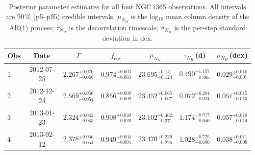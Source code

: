 \documentclass{aa}
\begin{document}
\begin{table}[ht]
  \centering
  \caption{Posterior parameter estimates for all four NGC\,1365
    observations. All intervals are 90\,\% (p5--p95) credible intervals.
    $\mu_{N_H}$ is the log$_{10}$ mean column density of the
    AR(1) process; $\tau_{N_H}$ is the decorrelation timescale;
    $\sigma_{N_H}$ is the per-step standard deviation in dex.}
  \label{tab:ngc1365_results}
  \begin{tabular}{lcccccc}
    \hline\hline
    Obs & Date & $\Gamma$ & $f_{\mathrm{cov}}$ & $\mu_{N_H}$ & $\tau_{N_H}$\,(d) & $\sigma_{N_H}$\,(dex) \\
    \hline
    1 & 2012-07-25 &
      $2.267^{+0.070}_{-0.066}$ &
      $0.974^{+0.002}_{-0.003}$ &
      $23.695^{+0.141}_{-0.124}$ &
      $0.490^{+1.157}_{-0.365}$ &
      $0.029^{+0.010}_{-0.007}$ \\[2pt]
    2 & 2012-12-24 &
      $2.569^{+0.056}_{-0.054}$ &
      $0.856^{+0.009}_{-0.009}$ &
      $23.452^{+0.065}_{-0.067}$ &
      $0.072^{+0.284}_{-0.024}$ &
      $0.051^{+0.015}_{-0.013}$ \\[2pt]
    3 & 2013-01-23 &
      $2.324^{+0.042}_{-0.043}$ &
      $0.908^{+0.030}_{-0.026}$ &
      $23.102^{+0.462}_{-0.371}$ &
      $1.174^{+0.617}_{-0.656}$ &
      $0.057^{+0.018}_{-0.014}$ \\[2pt]
    4 & 2013-02-12 &
      $2.378^{+0.056}_{-0.054}$ &
      $0.949^{+0.004}_{-0.004}$ &
      $23.470^{+0.229}_{-0.225}$ &
      $1.028^{+0.725}_{-0.680}$ &
      $0.038^{+0.011}_{-0.008}$ \\
    \hline\hline
  \end{tabular}
\end{table}
\end{document}
